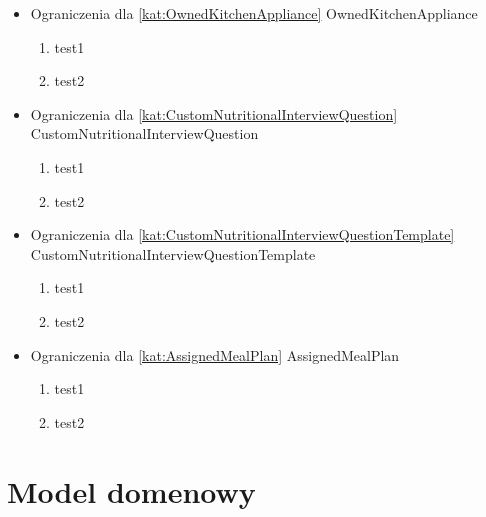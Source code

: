 \begin{itemize}[label={}]
\begin{enumerate}[label={\textbf{OGR/\protect\threedigits{\arabic{enumi}}}}, wide, labelwidth=!, resume]
    \end{enumerate}
    \item Ograniczenia dla \ref{kat:OwnedKitchenAppliance} OwnedKitchenAppliance
    \begin{enumerate}[label={\textbf{OGR/\protect\threedigits{\arabic{enumi}}}}, wide, labelwidth=!, resume]
        \item test1
        \item test2
    \end{enumerate}
    \item Ograniczenia dla \ref{kat:CustomNutritionalInterviewQuestion} CustomNutritionalInterviewQuestion
    \begin{enumerate}[label={\textbf{OGR/\protect\threedigits{\arabic{enumi}}}}, wide, labelwidth=!, resume]
        \item test1
        \item test2
    \end{enumerate}
    \item Ograniczenia dla \ref{kat:CustomNutritionalInterviewQuestionTemplate} CustomNutritionalInterviewQuestionTemplate
    \begin{enumerate}[label={\textbf{OGR/\protect\threedigits{\arabic{enumi}}}}, wide, labelwidth=!, resume]
        \item test1
        \item test2
    \end{enumerate}
    \item Ograniczenia dla \ref{kat:AssignedMealPlan} AssignedMealPlan
    \begin{enumerate}[label={\textbf{OGR/\protect\threedigits{\arabic{enumi}}}}, wide, labelwidth=!, resume]
        \item test1
        \item test2
    \end{enumerate}
\end{itemize}

\section{Model domenowy}

